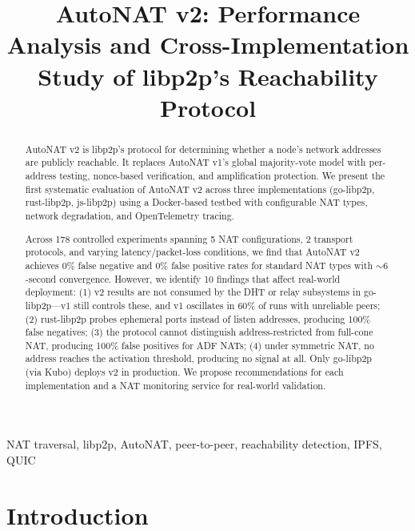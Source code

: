 \documentclass[conference]{IEEEtran}
\begin{document}
\title{AutoNAT v2: Performance Analysis and Cross-Implementation Study of libp2p's Reachability Protocol}

\author{
}

\maketitle

\begin{abstract}
AutoNAT v2 is libp2p's protocol for determining whether a node's network addresses are publicly reachable. It replaces AutoNAT v1's global majority-vote model with per-address testing, nonce-based verification, and amplification protection. We present the first systematic evaluation of AutoNAT v2 across three implementations (go-libp2p, rust-libp2p, js-libp2p) using a Docker-based testbed with configurable NAT types, network degradation, and OpenTelemetry tracing.

Across 178 controlled experiments spanning 5 NAT configurations, 2 transport protocols, and varying latency/packet-loss conditions, we find that AutoNAT v2 achieves 0\% false negative and 0\% false positive rates for standard NAT types with ${\sim}6$-second convergence. However, we identify 10 findings that affect real-world deployment: (1) v2 results are not consumed by the DHT or relay subsystems in go-libp2p---v1 still controls these, and v1 oscillates in 60\% of runs with unreliable peers; (2) rust-libp2p probes ephemeral ports instead of listen addresses, producing 100\% false negatives; (3) the protocol cannot distinguish address-restricted from full-cone NAT, producing 100\% false positives for ADF NATs; (4) under symmetric NAT, no address reaches the activation threshold, producing no signal at all. Only go-libp2p (via Kubo) deploys v2 in production. We propose recommendations for each implementation and a NAT monitoring service for real-world validation.
\end{abstract}

\begin{IEEEkeywords}
NAT traversal, libp2p, AutoNAT, peer-to-peer, reachability detection, IPFS, QUIC
\end{IEEEkeywords}

\section{Introduction}
\end{document}
